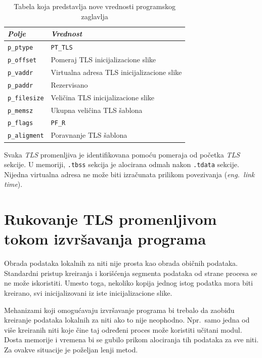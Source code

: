 \documentclass[12pt,oneside]{memoir}
\begin{document}
\begin{table}
		\begin{center}
		\begin{tabular}{ | l | l |}
			\hline
			\emph{Polje} & \emph{Vrednost} \\ \hline
			\texttt{p\_ptype} & \texttt{PT\_TLS} \\ \hline
			\texttt{p\_offset} & Pomeraj TLS inicijalizacione slike  \\ \hline
			\texttt{p\_vaddr} & Virtualna adresa TLS inicijalizacione slike  \\ \hline
			\texttt{p\_paddr} & Rezervisano  \\ \hline
			\texttt{p\_filesize} & Veličina TLS inicijalizacione slike  \\ \hline
			\texttt{p\_memsz} & Ukupna veličina TLS šablona  \\ \hline
			\texttt{p\_flags} & \texttt{PF\_R}  \\ \hline
			\texttt{p\_aligment} & Poravnanje TLS šablona  \\ \hline
		\end{tabular}
	   \end{center}
		\caption{\label{tab:tls_prheader}Tabela koja predstavlja nove vrednosti programskog zaglavlja}
\end{table}

Svaka \emph{TLS} promenljiva je identifikovana pomoću pomeraja od početka \emph{TLS} sekcije. U memoriji, \texttt{.tbss} sekcija je alocirana odmah nakon \texttt{.tdata} sekcije. Nijedna virtualna adresa ne može biti izračunata prilikom povezivanja (\emph{eng.~link time}).

\section{Rukovanje TLS promenljivom tokom izvršavanja programa}
\label{sec:izvrTls}

Obrada podataka lokalnih za niti nije prosta kao obrada običnih podataka. Standardni pristup kreiranja i korišćenja segmenta podataka od strane procesa se ne može iskoristiti. Umesto toga, nekoliko kopija jednog istog podatka mora biti kreirano, svi inicijalizovani iz iste inicijalizacione slike.

Mehanizami koji omogućavaju izvršavanje programa bi trebalo da zaobiđu kreiranje podataka lokalnih za niti ako to nije neophodno. Npr.~samo jedna od više kreiranih niti koje čine taj određeni proces
može koristiti učitani modul. Dosta memorije i vremena bi se gubilo prikom alociranja tih podataka za sve niti. Za ovakve situacije je poželjan lenji metod.
\end{document}
